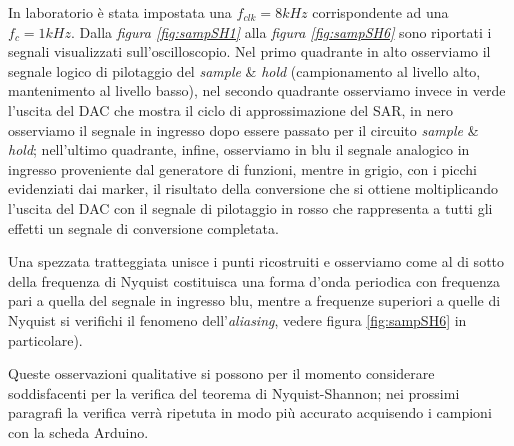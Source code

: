 \documentclass[journal]{IEEEtran}
\begin{document}


In laboratorio è stata impostata una $f_{clk} = 8 kHz$ corrispondente ad una $f_c = 1 kHz$. 
Dalla \textit{figura \ref{fig:sampSH1}} alla \textit{figura \ref{fig:sampSH6}} sono riportati i segnali visualizzati sull'oscilloscopio. 
Nel primo quadrante in alto osserviamo il segnale logico di pilotaggio del \textit{sample} \& \textit{hold} (campionamento al livello alto, mantenimento al livello basso), nel secondo quadrante osserviamo invece in verde l'uscita del DAC che mostra il ciclo di approssimazione del SAR, in nero osserviamo il segnale in ingresso dopo essere passato per il circuito \textit{sample} \& \textit{hold}; nell'ultimo quadrante, infine, osserviamo in blu il segnale analogico in ingresso proveniente dal generatore di funzioni, mentre in grigio, con i picchi evidenziati dai marker, il risultato della conversione che si ottiene moltiplicando l'uscita del DAC con il segnale di pilotaggio in rosso che rappresenta a tutti gli effetti un segnale di conversione completata. 

Una spezzata tratteggiata unisce i punti ricostruiti e osserviamo come al di sotto della frequenza di Nyquist costituisca una forma d'onda periodica con frequenza pari a quella del segnale in ingresso blu, mentre a frequenze superiori a quelle di Nyquist si verifichi il fenomeno dell'\textit{aliasing}, vedere figura \ref{fig:sampSH6} in particolare).

Queste osservazioni qualitative si possono per il momento considerare soddisfacenti per la verifica del teorema di Nyquist-Shannon; nei prossimi paragrafi la verifica verrà ripetuta in modo più accurato acquisendo i campioni con la scheda Arduino.
\end{document}
